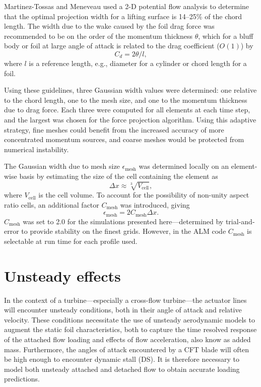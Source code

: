 \documentclass[times]{weauth}
\begin{document}
Martinez-Tossas and Meneveau \cite{Martinez-Tossas2015b} used a 2-D potential
flow analysis to determine that the optimal projection width for a lifting
surface is 14--25\% of the chord length. The width due to the wake caused by the
foil drag force was recommended to be on the order of the momentum thickness
$\theta$, which for a bluff body or foil at large angle of attack is related to
the drag coefficient ($O(1)$) by \cite{TennekesAndLumley}
\begin{equation}
    C_d = 2 \theta / l,
    \label{eq:mom-thickness}
\end{equation}
where $l$ is a reference length, e.g., diameter for a cylinder or chord length
for a foil.

Using these guidelines, three Gaussian width values were determined: one
relative to the chord length, one to the mesh size, and one to the momentum
thickness due to drag force. Each three were computed for all elements at each
time step, and the largest was chosen for the force projection algorithm. Using
this adaptive strategy, fine meshes could benefit from the increased accuracy of
more concentrated momentum sources, and coarse meshes would be protected from
numerical instability.

The Gaussian width due to mesh size $\epsilon_{\mathrm{mesh}}$ was determined
locally on an element-wise basis by estimating the size of the cell containing
the element as
\begin{equation}
    \Delta x \approx \sqrt[3]{V_\mathrm{cell}},
\end{equation}
where $V_\mathrm{cell}$ is the cell volume. To account for the possibility of
non-unity aspect ratio cells, an additional factor $C_\mathrm{mesh}$ was
introduced, giving
\begin{equation}
    \epsilon_{\mathrm{mesh}} = 2C_\mathrm{mesh} \Delta x.
\end{equation}
$C_{\mathrm{mesh}}$ was set to 2.0 for the simulations presented
here---determined by trial-and-error to provide stability on the finest grids.
However, in the ALM code $C_{\mathrm{mesh}}$ is selectable at run time for each
profile used.


\section{Unsteady effects}

In the context of a turbine---especially a cross-flow turbine---the actuator
lines will encounter unsteady conditions, both in their angle of attack and
relative velocity. These conditions necessitate the use of unsteady aerodynamic
models to augment the static foil characteristics, both to capture the time
resolved response of the attached flow loading and effects of flow acceleration,
also know as added mass. Furthermore, the angles of attack encountered by a CFT
blade will often be high enough to encounter dynamic stall (DS). It is therefore
necessary to model both unsteady attached and detached flow to obtain accurate
loading predictions.
\end{document}
